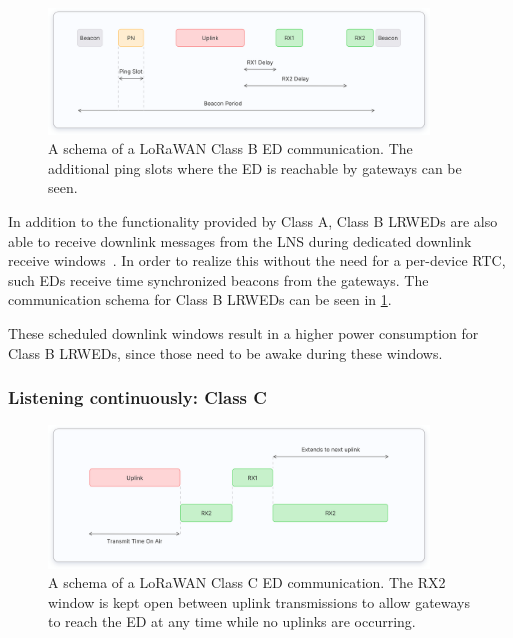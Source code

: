 \begin{figure}[htbp]
    \centering
    \includegraphics[width=0.9\textwidth]{pictures/device-classes/class-b.png}
    \caption{
        A schema of a \ac{LoRaWAN} Class B \acl{ED} communication.
        The additional ping slots where the \acl{ED} is reachable by gateways can be seen.~\protect\cite{the_things_industries_bv_device_nodate}
    }\label{pic:lorawan-device-class-b-schema}
\end{figure}

In addition to the functionality provided by Class A, Class B \aclp{LRWED} are also able to receive downlink messages from the \ac{LNS} during dedicated downlink receive windows~\cite[p. 67]{lora_alliance_inc_lorawan_specification_2017}.
In order to realize this without the need for a per-device \ac{RTC}, such \aclp{ED} receive time synchronized beacons from the gateways.
The communication schema for Class B \aclp{LRWED} can be seen in \cref{pic:lorawan-device-class-b-schema}.

These scheduled downlink windows result in a higher power consumption for Class B \aclp{LRWED}, since those need to be awake during these windows.

\subsubsection{Listening continuously: Class C}

\begin{figure}[htbp]
    \centering
    \includegraphics[width=0.9\textwidth]{pictures/device-classes/class-c.png}
    \caption{
        A schema of a \ac{LoRaWAN} Class C \acl{ED} communication.
        The RX2 window is kept open between uplink transmissions to allow gateways to reach the \acl{ED} at any time while no uplinks are occurring.~\protect\cite{the_things_industries_bv_device_nodate}
    }\label{pic:lorawan-device-class-c-schema}
\end{figure}

